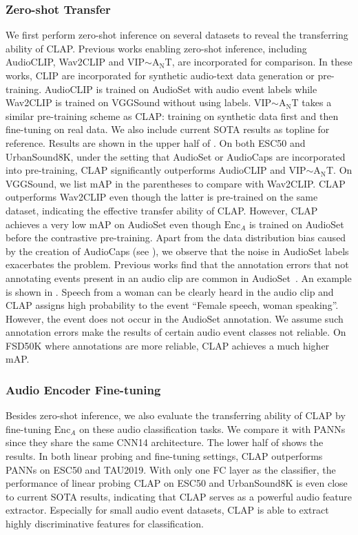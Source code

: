 \documentclass[sigconf,anonymous,review]{acmart}
\begin{document}
\subsubsection{Zero-shot Transfer}
We first perform zero-shot inference on several datasets to reveal the transferring ability of CLAP.
Previous works enabling zero-shot inference, including AudioCLIP, Wav2CLIP and VIP$\sim$A$_\text{N}$T, are incorporated for comparison.
In these works, CLIP are incorporated for synthetic audio-text data generation or pre-training.
AudioCLIP is trained on AudioSet with audio event labels while Wav2CLIP is trained on VGGSound without using labels.
VIP$\sim$A$_\text{N}$T takes a similar pre-training scheme as CLAP: training on synthetic data first and then fine-tuning on real data.
We also include current SOTA results as topline for reference.
Results are shown in the upper half of .
On both ESC50 and UrbanSound8K, under the setting that AudioSet or AudioCaps are incorporated into pre-training, CLAP significantly outperforms AudioCLIP and VIP$\sim$A$_\text{N}$T.
On VGGSound, we list mAP in the parentheses to compare with Wav2CLIP.
CLAP outperforms Wav2CLIP even though the latter is pre-trained on the same dataset, indicating the effective transfer ability of CLAP.
However, CLAP achieves a very low mAP on AudioSet even though $\text{Enc}_A$ is trained on AudioSet before the contrastive pre-training.
Apart from the data distribution bias caused by the creation of AudioCaps (see ), we observe that the noise in AudioSet labels exacerbates the problem.
Previous works find that the annotation errors that not annotating events present in an audio clip are common in AudioSet~\cite{gong2021psla}.
An example is shown in .
Speech from a woman can be clearly heard in the audio clip and CLAP assigns high probability to the event ``Female speech, woman speaking''.
However, the event does not occur in the AudioSet annotation.
We assume such annotation errors make the results of certain audio event classes not reliable.
On FSD50K where annotations are more reliable, CLAP achieves a much higher mAP.





\subsubsection{Audio Encoder Fine-tuning}
Besides zero-shot inference, we also evaluate the transferring ability of CLAP by fine-tuning $\text{Enc}_A$ on these audio classification tasks.
We compare it with PANNs since they share the same CNN14 architecture.
The lower half of  shows the results.
In both linear probing and fine-tuning settings, CLAP outperforms PANNs on ESC50 and TAU2019.
With only one FC layer as the classifier, the performance of linear probing CLAP on ESC50 and UrbanSound8K is even close to current SOTA results, indicating that CLAP serves as a powerful audio feature extractor.
Especially for small audio event datasets, CLAP is able to extract highly discriminative features for classification.
\end{document}
